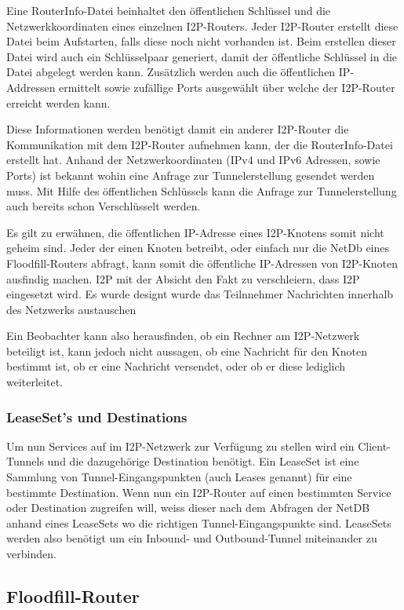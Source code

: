 Eine RouterInfo-Datei beinhaltet den öffentlichen Schlüssel und die Netzwerkkoordinaten eines einzelnen I2P-Routers.
Jeder I2P-Router erstellt diese Datei beim Aufstarten, falls diese noch nicht vorhanden ist.
Beim erstellen dieser Datei wird auch ein Schlüsselpaar generiert, damit der öffentliche Schlüssel in die Datei abgelegt werden kann.
Zusätzlich werden auch die öffentlichen IP-Addressen ermittelt sowie zufällige Ports ausgewählt über welche der I2P-Router erreicht werden kann.

Diese Informationen werden benötigt damit ein anderer I2P-Router die Kommunikation mit dem I2P-Router aufnehmen kann, der die RouterInfo-Datei erstellt hat.
Anhand der Netzwerkoordinaten (IPv4 und IPv6 Adressen, sowie Ports) ist bekannt wohin eine Anfrage zur Tunnelerstellung gesendet werden muss.
Mit Hilfe des öffentlichen Schlüssels kann die Anfrage zur Tunnelerstellung auch bereits schon Verschlüsselt werden. 

Es gilt zu erwähnen, die öffentlichen IP-Adresse eines I2P-Knotens somit nicht geheim sind.
Jeder der einen Knoten betreibt, oder einfach nur die NetDb eines Floodfill-Routers abfragt, kann somit die öffentliche IP-Adressen von I2P-Knoten ausfindig machen.
I2P mit der Absicht den Fakt zu verschleiern, dass I2P eingesetzt wird. Es wurde designt wurde das Teilnnehmer Nachrichten innerhalb des Netzwerks austauschen 

Ein Beobachter kann also herausfinden, ob ein Rechner am I2P-Netzwerk beteiligt ist, kann jedoch nicht aussagen, ob eine Nachricht für den Knoten bestimmt ist, ob er eine Nachricht versendet, oder ob er diese lediglich weiterleitet.

\subsubsection{LeaseSet's und Destinations}

Um nun Services auf im I2P-Netzwerk zur Verfügung zu stellen wird ein Client-Tunnels und die dazugehörige Destination benötigt.
Ein LeaseSet ist eine Sammlung von Tunnel-Eingangspunkten (auch Leases genannt) für eine bestimmte Destination.
Wenn nun ein I2P-Router auf einen bestimmten Service oder Destination zugreifen will, weiss dieser nach dem Abfragen der NetDB anhand eines LeaseSets
wo die richtigen Tunnel-Eingangspunkte sind.
LeaseSets werden also benötigt um ein Inbound- und Outbound-Tunnel miteinander zu verbinden.

\subsection{Floodfill-Router}

